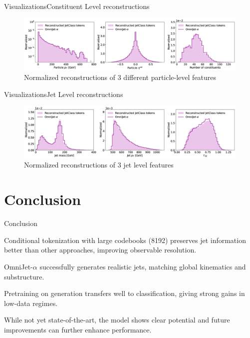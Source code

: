 \documentclass[10pt]{beamer}
\let\olditemize\itemize
\let\endolditemize\enditemize
\renewenvironment{itemize}{
  \olditemize[<+->] %
}{\endolditemize}
\begin{document}
\begin{frame}{Visualizations}{Constituent Level reconstructions}
  \begin{figure}
    \includegraphics[width=\textwidth]{images/particle_reconstructions.png}
    \caption{Normalized reconstructions of 3 different particle-level features}
  \end{figure}
\end{frame}

\begin{frame}{Visualizations}{Jet Level reconstructions}
  \begin{figure}
    \includegraphics[width=\textwidth]{images/jet_reconstructions.png}
    \caption{Normalized reconstructions of 3 jet level features}
  \end{figure}
\end{frame}

\section{Conclusion}

\begin{frame}{Conclusion}

\begin{itemize}
  \item Conditional tokenization with large codebooks (8192) preserves jet information better than other approaches, improving observable resolution.
  \item OmniJet-$\alpha$ successfully generates realistic jets, matching global kinematics and substructure.
  \item Pretraining on generation transfers well to classification, giving strong gains in low-data regimes.
  \item While not yet state-of-the-art, the model shows clear potential and future improvements can further enhance performance.
\end{itemize}

\end{frame}
\end{document}
